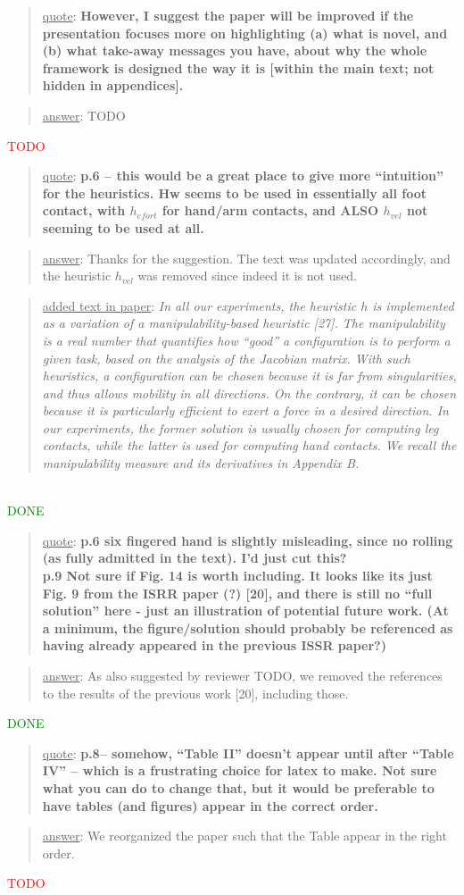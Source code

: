 \documentclass[a4paper]{article}
\newcommand{\done}[0]{\textcolor{green}{DONE}}
\newcommand{\ndone}[0]{\textcolor{red}{TODO}}
\newcommand\quot[1]{\begin{quote} \underline{quote}: \textbf{#1}\end{quote}}
\newcommand\as[1]{\begin{quote} \underline{answer}: {#1}\end{quote} }
\newcommand\qt[1]{\begin{quote} \underline{added text in paper}: \textit{#1}\end{quote} \leavevmode \\ }
\begin{document}
\quot{
However, I suggest the paper will be improved if
the presentation focuses more on highlighting (a) what is novel, and
(b)
what take-away messages you have, about why the whole framework is
designed the way it is [within the main text; not hidden in
appendices].}

\as{TODO}\ndone

\quot{
p.6 – this would be a great place to give more ``intuition'' for the heuristics. Hw seems to be used in essentially all foot contact, with $h_{efort}$ for hand/arm contacts, and ALSO $h_{vel}$ not seeming to be used at all.}
\as{Thanks for the suggestion. The text was updated accordingly, and the heuristic $h_{vel}$ was removed since indeed it is not used.} 
\qt{In all our experiments, the heuristic $h$ is implemented as a variation of a manipulability-based heuristic [27]. The manipulability is a real number that quantifies how 
``good'' a configuration is to perform a given task, based on the analysis of the Jacobian matrix. With such heuristics, a configuration can be chosen because it is far from singularities, and thus allows mobility in all directions. On the contrary, it can be chosen because it is particularly efficient to exert a force in a desired direction. In our experiments, the former solution is usually chosen for computing leg contacts, while the latter is used for computing hand contacts. We recall the manipulability measure and its derivatives in Appendix B.}\done


\quot{
p.6 six fingered hand is slightly misleading, since no rolling (as fully admitted in the text). I'd just cut this? \\
p.9 Not sure if Fig. 14 is worth including. It looks like its just Fig. 9 from the ISRR paper (?) [20], and there is still no ``full solution'' here -
 just an illustration of potential future work. 
 (At a minimum, the figure/solution should probably be referenced as having already appeared in the previous ISSR paper?)
}

\as{As also suggested by reviewer TODO, we removed the references to the results of the previous work [20], including those.}\done

\quot{
p.8– somehow, “Table II” doesn’t appear until after “Table IV” – which is a frustrating choice for latex to make. Not sure what you can do to change that, but it would be preferable to have tables (and figures) appear in the correct order.
}

\as{We reorganized the paper such that the Table appear in the right order.}\ndone
\end{document}
